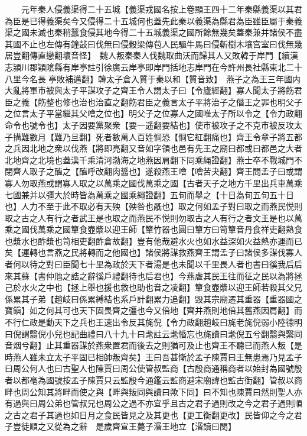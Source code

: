 　　元年秦人侵義渠得二十五城【義渠戎國名按上卷顯王四十二年秦縣義渠以其君為臣是已得義渠矣今又侵得二十五城何也蓋先此秦以義渠為縣君為臣雖臣屬于秦義渠之國未滅也秦稍蠶食侵其地今得二十五城義渠之國所餘無幾矣蓋秦兼并諸侯不盡其國不止也左傳有鐘鼔曰伐無曰侵穀梁傳苞人民驅牛馬曰侵斬樹木壤宫室曰伐無幾居豈翻傳直戀翻壞音怪】　魏人叛秦秦人伐魏取曲沃而歸其人又敗韓于岸門【續漢志潁川郡穎隂縣有岸亭註引徐廣云岸亭即岸門括地志岸門在今許州長社縣東北二十八里今名長亭敗補邁翻】韓太子倉入質于秦以和【質音致】　燕子之為王三年國内大亂將軍市被與太子平謀攻子之齊王令人謂太子曰【令廬經翻】寡人聞太子將飭君臣之義【飭整也修也治也治直之翻飭君臣之義言太子平將治子之僭王之罪也明父子之位言太子平當繼其父噲之位也】明父子之位寡人之國唯太子所以令之【令力政翻命令也號令也】太子因要黨聚衆【要一遥翻要結也】使市被攻子之不克市被反攻太子搆難數月【難乃旦翻】死者數萬人百姓恫恐【恫它紅翻痛也】齊王令章子將五都之兵因北地之衆以伐燕【將即亮翻又音如字領也邑有先王之廟曰都或曰都邑之大者北地齊之北境也蓋漢千乘清河渤海之地燕因肩翻下同乘䋲證翻】燕士卒不戰城門不閉齊人取子之醢之【醢呼改翻肉醤也】遂殺燕王噲【噲苦夬翻】齊王問孟子曰或謂寡人勿取燕或謂寡人取之以萬乘之國伐萬乘之國【古者天子之地方千里出兵車萬乘七國兼并以彊大於時皆為萬乘之國乘繩證翻】五旬而舉之【十日為旬五旬五十日也】人力不至于此不取必有天殃【殃咎也旤也】取之何如孟子對曰取之而燕民悦則取之古之人有行之者武王是也取之而燕民不悦則勿取古之人有行之者文王是也以萬乘之國伐萬乘之國簞食壺漿以迎王師【簞竹器也圓曰簞方曰笥簞音丹食祥吏翻熟食也漿水也酢漿也笥相吏翻酢倉故翻】豈有他哉避水火也如水益深如火益熱亦運而已矣【運轉也言燕之民將轉而之他國也】諸侯將謀救燕齊王謂孟子曰諸侯多謀伐寡人者何以待之對曰臣聞七十里為政於天下者湯是也未聞以千里畏人者也書曰徯我后后來其蘇【書仲虺之誥之辭徯戶禮翻待也后君也】今燕虐其民王往而征之民以為將拯己於水火之中也【拯上舉也援也救也助也音之凌翻】簞食壺漿以迎王師若殺其父兄係累其子弟【趙岐曰係累縛結也系戶計翻累力追翻】毁其宗廟遷其重器【重器國之寶鎭】如之何其可也天下固畏齊之彊也今又倍地【齊并燕則地倍其舊燕因肩翻】而不行仁政是動天下之兵也王速出令反其旄倪【令力政翻趙岐曰旄老旄倪弱小陸德明曰倪謂翳倪小兒也記曲禮曰八十九十曰耄註云耄惛忘也旄讀曰耄倪五兮翻翳與繄同音烟兮翻】止其重器謀於燕衆置君而後去之則猶可及止也齊王不聽已而燕人叛【是時燕人雖未立太子平固已相帥叛齊矣】王曰吾甚慚於孟子陳賈曰王無患焉乃見孟子曰周公何人也曰古聖人也陳賈曰周公使管叔監商【古殷商通稱商者以始封為國號殷者以都亳為國號按孟子陳賈只云監殷今通鑑云監商避宋廟諱也監古衘翻】管叔以商畔也周公知其將畔而使之與【畔與叛同與讀曰歟下同】曰不知也陳賈曰然則聖人亦有過與曰周公弟也管叔兄也周公之過不亦宜乎且古之君子過則改之今之君子過則順之古之君子其過也如日月之食民皆見之及其更也【更工衡翻更改】民皆仰之今之君子豈徒順之又從為之辭　是歲齊宣王薨子湣王地立【湣讀曰閔】

